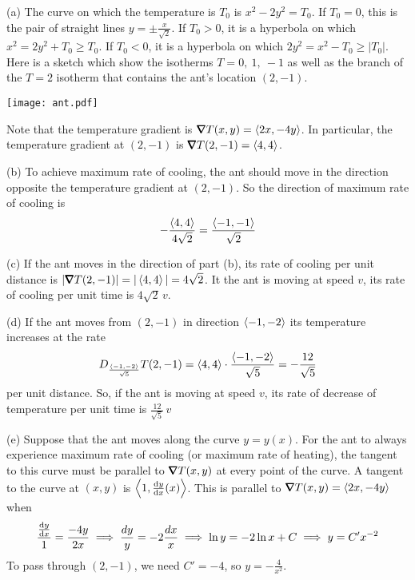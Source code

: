 \begin{solution}
(a) The curve on which the temperature is $T_0$ is $x^2-2y^2=T_0$.
If $T_0=0$, this is the pair of straight lines $y=\pm\frac{x}{\sqrt{2}}$.
If $T_0>0$, it is a hyperbola on which $x^2=2y^2+T_0\ge T_0$.
If $T_0<0$, it is a hyperbola on which $2y^2=x^2-T_0\ge |T_0|$.
Here is a sketch which show the isotherms $T=0,\ 1,\ -1$ as well
as the branch of the $T=2$ isotherm that contains the ant's location
$(2,-1)$.
\begin{center}
     \texttt{[image: ant.pdf]}
\end{center}
Note that the temperature gradient is $\vnabla T(x,y)=\llt 2x,-4y\rgt$.
In particular, the temperature gradient at $(2,-1)$
is $\vnabla T(2,-1)=\llt 4,4\rgt$.

(b) To achieve maximum rate of cooling, the ant should move in the direction
opposite the temperature gradient at $(2,-1)$. So the direction of
maximum rate of cooling is 
\begin{equation*}
-\frac{\left< 4,4\right>}{4\sqrt{2}}
    =\frac{\left< -1,-1\right>}{\sqrt{2}}
\end{equation*}

(c) If the ant moves in the direction of part (b), its rate of cooling
per unit distance is $|\vnabla T(2,-1)|=|\llt 4,4\rgt| = 4\sqrt{2}$.
It the ant is moving at speed $v$, its rate of cooling
per unit time is $4\sqrt{2}\,v$.

(d) If the ant moves from $(2,-1)$  in direction $\left< -1,-2\right>$
its temperature increases at the rate 
\begin{equation*}
  D_{\frac{\left< -1,-2\right>}{\sqrt{5}}} T(2,-1)
        = \left< 4,4\right>\cdot \frac{\left< -1,-2\right>}{\sqrt{5}}
        = -\frac{12}{\sqrt{5}}
\end{equation*}
per unit distance. So, if the ant is moving at speed $v$,
its rate of decrease of temperature per unit time
is $\frac{12}{\sqrt{5}}\,v$



(e) Suppose that the ant moves along the curve $y=y(x)$. For the ant to always
experience maximum rate of cooling (or maximum rate of heating), 
the tangent to this curve must be parallel to $\vnabla T(x,y)$ at every point of the curve. A tangent to the curve at $(x,y)$ is $\llt 1,\diff{y}{x}(x)\rgt$.
This is parallel to $\vnabla T(x,y)=\llt 2x,-4y\rgt$ when
\begin{align*}
\frac{\diff{y}{x}}{1}=\frac{-4y}{2x}
\implies \frac{dy}{y}=-2\frac{dx}{x}
\implies \ln y=-2\ln x+C
\implies y=C'x^{-2}
\end{align*}
To pass through $(2,-1)$, we need $C'=-4$, so $y=-\frac{4}{x^2}$.


\end{solution}
